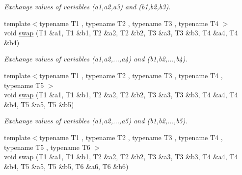 \begin{DoxyCompactItemize}
\begin{DoxyCompactList}\small\item\em Exchange values of variables ({\ttfamily a1},{\ttfamily a2},{\ttfamily a3}) and ({\ttfamily b1},{\ttfamily b2},{\ttfamily b3}). \end{DoxyCompactList}\item 
\mbox{\label{namespacecimg__library__suffixed_1_1cimg_af4d154f5618084396d21cad69ad479d9}} 
{\footnotesize template$<$typename T1 , typename T2 , typename T3 , typename T4 $>$ }\\void \hyperlink{namespacecimg__library__suffixed_1_1cimg_af4d154f5618084396d21cad69ad479d9}{swap} (T1 \&a1, T1 \&b1, T2 \&a2, T2 \&b2, T3 \&a3, T3 \&b3, T4 \&a4, T4 \&b4)
\begin{DoxyCompactList}\small\item\em Exchange values of variables ({\ttfamily a1},{\ttfamily a2},...,{\ttfamily a4}) and ({\ttfamily b1},{\ttfamily b2},...,{\ttfamily b4}). \end{DoxyCompactList}\item 
\mbox{\label{namespacecimg__library__suffixed_1_1cimg_a33b9455bf35220ad528091a83ac68707}} 
{\footnotesize template$<$typename T1 , typename T2 , typename T3 , typename T4 , typename T5 $>$ }\\void \hyperlink{namespacecimg__library__suffixed_1_1cimg_a33b9455bf35220ad528091a83ac68707}{swap} (T1 \&a1, T1 \&b1, T2 \&a2, T2 \&b2, T3 \&a3, T3 \&b3, T4 \&a4, T4 \&b4, T5 \&a5, T5 \&b5)
\begin{DoxyCompactList}\small\item\em Exchange values of variables ({\ttfamily a1},{\ttfamily a2},...,{\ttfamily a5}) and ({\ttfamily b1},{\ttfamily b2},...,{\ttfamily b5}). \end{DoxyCompactList}\item 
\mbox{\label{namespacecimg__library__suffixed_1_1cimg_a36c2243bde47df38d2d29c32a044e531}} 
{\footnotesize template$<$typename T1 , typename T2 , typename T3 , typename T4 , typename T5 , typename T6 $>$ }\\void \hyperlink{namespacecimg__library__suffixed_1_1cimg_a36c2243bde47df38d2d29c32a044e531}{swap} (T1 \&a1, T1 \&b1, T2 \&a2, T2 \&b2, T3 \&a3, T3 \&b3, T4 \&a4, T4 \&b4, T5 \&a5, T5 \&b5, T6 \&a6, T6 \&b6)

\end{DoxyCompactItemize}
